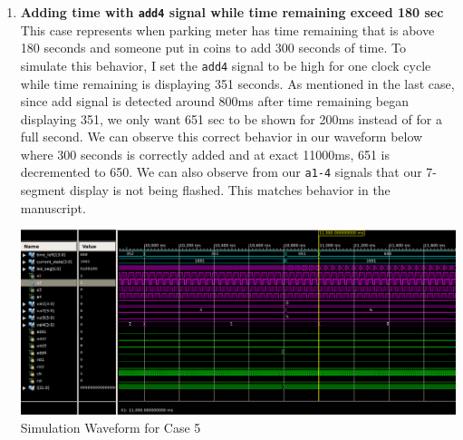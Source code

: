 \documentclass{article}
\begin{document}
\begin{enumerate}
    \item \textbf{Adding time with \texttt{add4} signal while time remaining exceed 180 sec}  \\
    This case represents when parking meter has time remaining that is above 180 seconds and someone put in coins to add 300 seconds of time. To simulate this behavior, I set the \texttt{add4} signal to be high for one clock cycle while time remaining is displaying 351 seconds. As mentioned in the last case, since add signal is detected around 800ms after time remaining began displaying 351, we only want 651 sec to be shown for 200ms instead of for a full second. We can observe this correct behavior in our waveform below where 300 seconds is correctly added and at exact 11000ms, 651 is decremented to 650. We can also observe from our \texttt{a1-4} signals that our 7-segment display is not being flashed. This matches behavior in the manuscript.
    \begin{center}
        \includegraphics[scale=0.34]{waveform-5.png} \\
        \caption{Simulation Waveform for Case 5}
    \end{center}
    

\end{enumerate}
\end{document}
